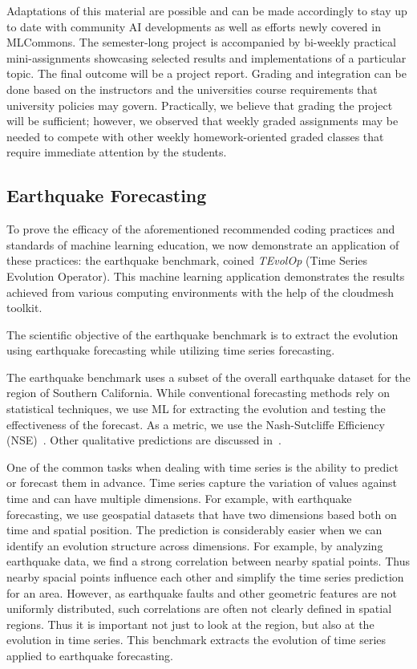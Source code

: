 \documentclass[utf8]{FrontiersinVancouver} %
\begin{document}
Adaptations of this material are possible and can be made accordingly to stay up to date with community AI developments as well as efforts newly covered in MLCommons. The semester-long project is accompanied by bi-weekly practical mini-assignments showcasing selected results and implementations of a particular topic. The final outcome will be a project report. Grading and integration can be done based on the instructors and the universities course requirements that university policies may govern. Practically, we believe that grading the project will be sufficient; however, we observed that weekly graded assignments may be needed to compete with other weekly homework-oriented graded classes that require immediate attention by the students.


\subsection{Earthquake Forecasting}
\label{sec:eq}

To prove the efficacy of the aforementioned recommended coding practices and standards of machine learning education, we now demonstrate an application of these practices: the earthquake benchmark, coined {\em TEvolOp} (Time Series Evolution Operator). This machine learning application demonstrates the results achieved from various computing environments with the help of the cloudmesh toolkit.

The scientific objective of the earthquake benchmark is to extract the evolution using earthquake forecasting while utilizing time series forecasting.

The earthquake benchmark uses a subset of the overall earthquake dataset for the region of Southern California. While conventional forecasting methods rely on statistical techniques, we use ML for extracting the evolution and testing the effectiveness of the forecast. As a metric, we use the Nash-Sutcliffe Efficiency (NSE)~\citep{nash-79}. Other qualitative predictions are discussed in~\citep{fox2022-jm}.

One of the common tasks when dealing with time series is the ability to predict or forecast them in advance. Time series capture the variation of values against time and can have multiple dimensions. For example, with earthquake forecasting, we use geospatial datasets that have two dimensions based both on time and spatial position. The prediction is considerably easier when we can identify an evolution structure across dimensions. For example, by analyzing earthquake data, we find a strong correlation between nearby spatial points. Thus nearby spacial points influence each other and simplify the time series prediction for an area. However, as earthquake faults and other geometric features are not uniformly distributed, such correlations are often not clearly defined in spatial regions. Thus it is important not just to look at the region, but also at the evolution in time series. This benchmark extracts the evolution of time series applied to earthquake forecasting.
\end{document}
